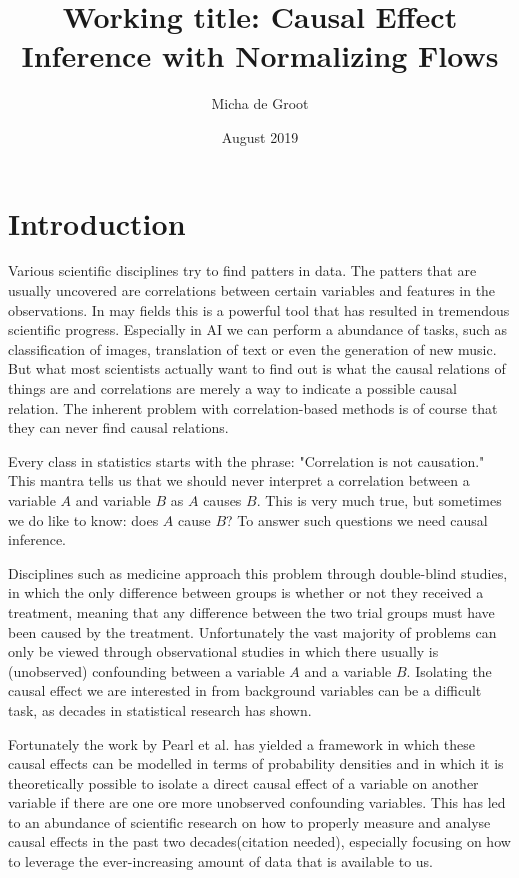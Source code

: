 \documentclass{article}
\title{Working title: Causal Effect Inference with Normalizing Flows}
\author{Micha de Groot}
\date{August 2019}
\begin{document}
\maketitle


\section{Introduction} 
Various scientific disciplines try to find patters in data. The patters that are usually uncovered are correlations between certain variables and features in the observations. In may fields this is a powerful tool that has resulted in tremendous scientific progress. Especially in AI we can perform a abundance of tasks, such as classification of images, translation of text or even the generation of new music. %
But what most scientists actually want to find out is what the causal relations of things are and correlations are merely a way to indicate a possible causal relation. The inherent problem with correlation-based methods is of course that they can never find causal relations.

Every class in statistics starts with the phrase: "Correlation is not causation." This mantra tells us that we should never interpret a correlation between a variable $A$ and variable $B$ as $A$ causes $B$. This is very much true, but sometimes we do like to know: does $A$ cause $B$? To answer such questions we need causal inference. 

Disciplines such as medicine approach this problem through double-blind studies, in which the only difference between groups is whether or not they received a treatment, meaning that any difference between the two trial groups must have been caused by the treatment. Unfortunately the vast majority of problems can only be viewed through observational studies in which there usually is (unobserved) confounding between a variable $A$ and a variable $B$. Isolating the causal effect we are interested in from background variables can be a difficult task, as decades in statistical research has shown.

Fortunately the work by Pearl et al.\cite{pearl2009causal} \cite{pearl1995causal} has yielded a framework in which these causal effects can be modelled in terms of probability densities and in which it is theoretically possible to isolate a direct causal effect of a variable on another variable if there are one ore more unobserved confounding variables. This has led to an abundance of scientific research on how to properly measure and analyse causal effects in the past two decades(citation needed), especially focusing on how to leverage the ever-increasing amount of data that is available to us. 
\end{document}

